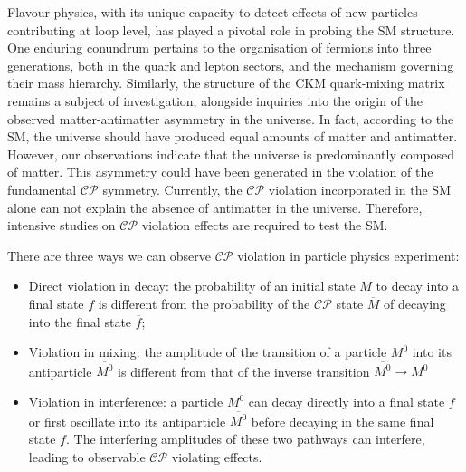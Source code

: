 Flavour physics, with its unique capacity to detect effects of new particles contributing at loop level, has played a pivotal role in probing the SM structure. One enduring conundrum pertains to the organisation of fermions into three generations, both in the quark and lepton sectors, and the mechanism governing their mass hierarchy. Similarly, the structure of the CKM quark-mixing matrix remains a subject of investigation, alongside inquiries into the origin of the observed matter-antimatter asymmetry in the universe. In fact, according to the SM, the universe should have produced equal amounts of matter and antimatter. However, our observations indicate that the universe is predominantly composed of matter. This asymmetry could have been generated in the violation of the fundamental $\mathcal{CP}$ symmetry.  Currently, the $\mathcal{CP}$ violation incorporated in the SM alone can not explain the absence of antimatter in the universe. Therefore, intensive studies on $\mathcal{CP}$ violation effects are required to test the SM.

There are three ways we can observe $\mathcal{CP}$ violation in particle physics experiment:
 \begin{itemize}
     \item Direct violation in decay: the probability of an initial state $M$ to decay into a final state $f$ is different from the probability of the $\mathcal{CP}$ state $\overline{M}$ of decaying into the final state $\overline{f}$;
     \item Violation in mixing: the amplitude of the transition of a particle $M^0$ into its antiparticle $\overline{M^0}$ is different from that of the inverse transition $\overline{M^0}\longrightarrow M^0$
     \item Violation in interference: a particle $M^0$ can decay directly into a final state $f$ or first oscillate into its antiparticle $\overline{M^0}$ before decaying in the same final state $f$. The interfering amplitudes of these two pathways can interfere, leading to observable $\mathcal{CP}$ violating effects.
 \end{itemize}
 
